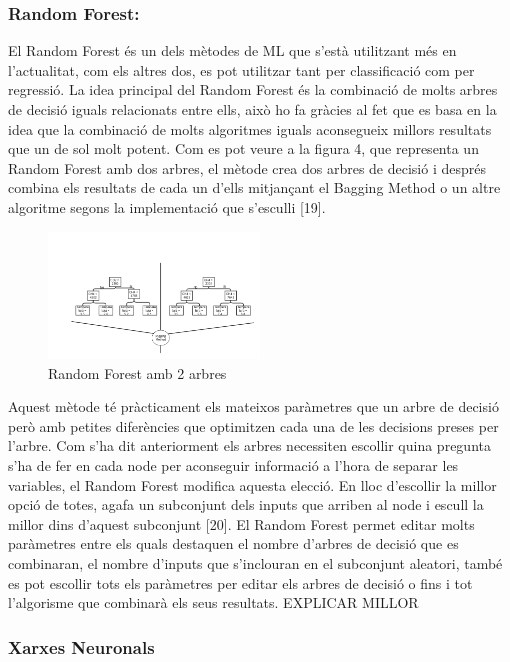\documentclass[10pt,a4paper,twocolumn,twoside]{article}
\begin{document}
\subsubsection{Random Forest:}
El Random Forest és un dels mètodes de ML que s'està utilitzant més en l'actualitat, com els altres dos, es pot utilitzar tant per classificació com per regressió. La idea principal del Random Forest és la combinació de molts arbres de decisió iguals relacionats entre ells, això ho fa gràcies al fet que es basa en la idea que la combinació de molts algoritmes iguals aconsegueix millors resultats que un de sol molt potent. Com es pot veure a la figura 4, que representa un Random Forest amb dos arbres, el mètode crea dos arbres de decisió i després combina els resultats de cada un d'ells mitjançant el Bagging Method o un altre algoritme segons la implementació que s'esculli [19].
\begin{figure}[!h]
\centering
	\includegraphics[width=0.5\textwidth]{../img/randomForest}
	\caption{Random Forest amb 2 arbres}
	\label{fig-RandomForest}
\end{figure}

Aquest mètode té pràcticament els mateixos paràmetres que un arbre de decisió però amb petites diferències que optimitzen cada una de les decisions preses per l'arbre. Com s'ha dit anteriorment els arbres necessiten escollir quina pregunta s'ha de fer en cada node per aconseguir informació a l'hora de separar les variables, el Random Forest modifica aquesta elecció. En lloc d'escollir la millor opció de totes, agafa un subconjunt dels inputs que arriben al node i escull la millor dins d'aquest subconjunt [20]. El Random Forest permet editar molts paràmetres entre els quals destaquen el nombre d'arbres de decisió que es combinaran, el nombre d'inputs que s'inclouran en el subconjunt aleatori, també es pot escollir tots els paràmetres per editar els arbres de decisió o fins i tot l'algorisme que combinarà els seus resultats.
EXPLICAR MILLOR
\subsubsection{Xarxes Neuronals}
\end{document}
